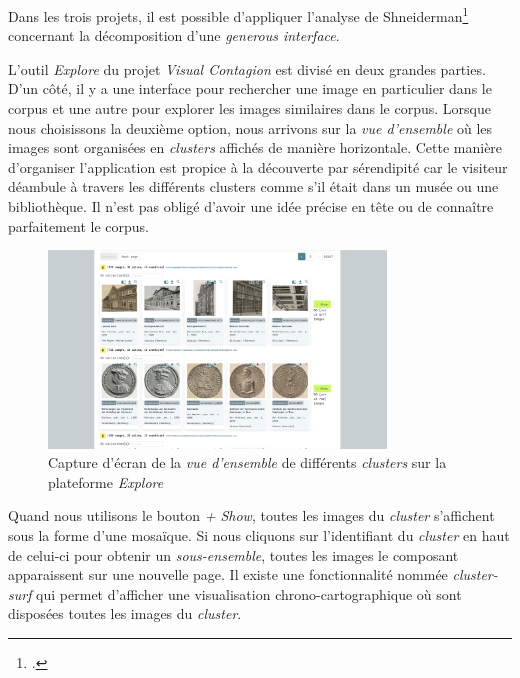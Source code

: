 Dans les trois projets, il est possible d'appliquer l'analyse de Shneiderman\footcite{shneidermanEyesHaveIt} concernant la décomposition d'une \textit{generous interface}.

L'outil \textit{Explore} du projet \textit{Visual Contagion} est divisé en deux grandes parties. D'un côté, il y a une interface pour rechercher une image en particulier dans le corpus et une autre pour explorer les images similaires dans le corpus. Lorsque nous choisissons la deuxième option, nous arrivons sur la \textit{vue d'ensemble} où les images sont organisées en \textit{clusters} affichés de manière horizontale. Cette manière d'organiser l'application est propice à la découverte par sérendipité car le visiteur déambule à travers les différents clusters comme s'il était dans un musée ou une bibliothèque. Il n'est pas obligé d'avoir une idée précise en tête ou de connaître parfaitement le corpus. 

\begin{figure}[H]
	\centering
	\includegraphics[width=0.8\textwidth]{images/visual_contagion_1.png}
	\caption{Capture d'écran de la \textit{vue d'ensemble} de différents \textit{clusters} sur la plateforme \textit{Explore}}
	\label{fig:explore_1}
\end{figure}

Quand nous utilisons le bouton \textit{+ Show}, toutes les images du \textit{cluster} s'affichent sous la forme d'une mosaïque. Si nous cliquons sur l'identifiant du \textit{cluster} en haut de celui-ci pour obtenir un \textit{sous-ensemble}, toutes les images le composant apparaissent sur une nouvelle page. Il existe une fonctionnalité nommée \textit{cluster-surf} qui permet d'afficher une visualisation chrono-cartographique où sont disposées toutes les images du \textit{cluster}. 


